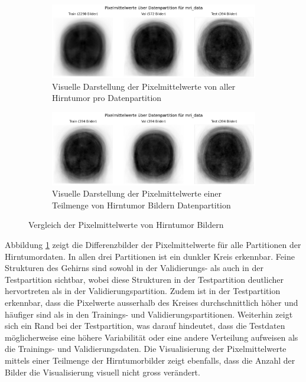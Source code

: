 \begin{figure}[H]
    \centering
    \begin{subfigure}[b]{0.49\linewidth}
        \centering
        \includegraphics[width=\linewidth]{01-images/03-data/brain-pixelmittelwerte.png}
        \caption{Visuelle Darstellung der Pixelmittelwerte von aller Hirntumor pro Datenpartition}
        \label{fig:brain-pixelmittelwert-full}
    \end{subfigure}
    \hfill
    \begin{subfigure}[b]{0.49\linewidth}
        \centering
        \includegraphics[width=\linewidth]{01-images/03-data/brain-pixelmittelwert-subsample-train.png}
        \caption{Visuelle Darstellung der Pixelmittelwerte einer Teilmenge von Hirntumor Bildern Datenpartition}
        \label{fig:brain-pixelmittelwert-subsample}
    \end{subfigure}
    \caption{Vergleich der Pixelmittelwerte von Hirntumor Bildern}
    \label{fig:brain-pixelmittelwert-comparison}
\end{figure}

Abbildung \ref{fig:brain-pixelmittelwert-full} zeigt die Differenzbilder der Pixelmittelwerte für alle Partitionen der Hirntumordaten. In allen drei Partitionen ist ein dunkler Kreis erkennbar. Feine Strukturen des Gehirns sind sowohl in der Validierungs- als auch in der Testpartition sichtbar, wobei diese Strukturen in der Testpartition deutlicher hervortreten als in der Validierungspartition. Zudem ist in der Testpartition erkennbar, dass die Pixelwerte ausserhalb des Kreises durchschnittlich höher und häufiger sind als in den Trainings- und Validierungspartitionen. Weiterhin zeigt sich ein Rand bei der Testpartition, was darauf hindeutet, dass die Testdaten möglicherweise eine höhere Variabilität oder eine andere Verteilung aufweisen als die Trainings- und Validierungsdaten. Die Visualisierung der Pixelmittelwerte mittels einer Teilmenge der Hirntumorbilder zeigt ebenfalls, dass die Anzahl der Bilder die Visualisierung visuell nicht gross verändert.

